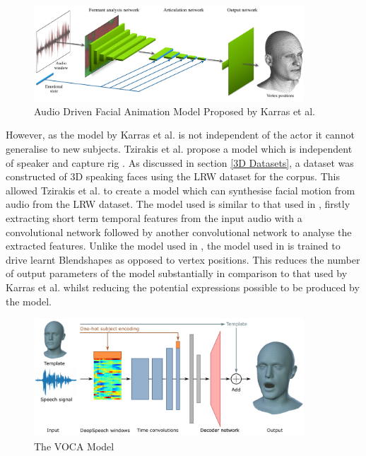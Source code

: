 \begin{figure}[h]
    \centering
        \includegraphics[width=0.9\textwidth]{figures/lit_review/karras_model.png}
    \caption{Audio Driven Facial Animation Model Proposed by Karras et al. \cite{Karras2017a}}\label{fig:Karras_Model}
\end{figure}

However, as the model by Karras et al. is not independent of the actor it cannot generalise to new subjects.
Tzirakis et al. propose a model which is independent of speaker and capture rig \cite{Tzirakis2019}.
As discussed in section \ref{3D Datasets}, a dataset was constructed of 3D speaking faces using the LRW dataset \cite{Chung2016} for the corpus.
This allowed Tzirakis et al. to create a model which can synthesise facial motion from audio from the LRW dataset.
The model used is similar to that used in \cite{Karras2017a}, firstly extracting short term temporal features from the input audio with a convolutional network followed by another convolutional network to analyse the extracted features.
Unlike the model used in \cite{Karras2017a}, the model used in \cite{Tzirakis2019} is trained to drive learnt Blendshapes as opposed to vertex positions.
This reduces the number of output parameters of the model substantially in comparison to that used by Karras et al. whilst reducing the potential expressions possible to be produced by the model.

\begin{figure}[h]
    \centering
        \includegraphics[width=0.9\textwidth]{figures/lit_review/voca_model.png}
    \caption{The VOCA Model \cite{Cudeiro2019}}\label{fig:VOCA_model}
\end{figure}

